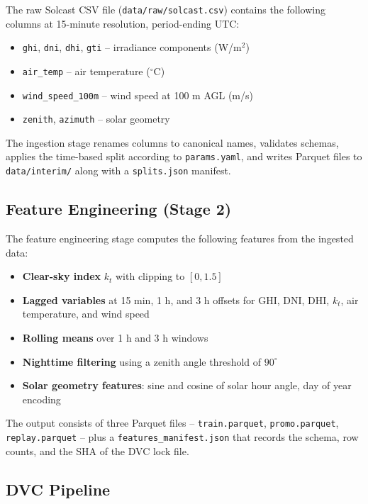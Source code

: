 \documentclass[11pt,a4paper]{article}
\begin{document}
The raw Solcast CSV file (\texttt{data/raw/solcast.csv}) contains the following columns at 15-minute resolution, period-ending UTC:

\begin{itemize}
    \item \texttt{ghi}, \texttt{dni}, \texttt{dhi}, \texttt{gti}  --  irradiance components (W/m$^2$)
    \item \texttt{air\_temp}  --  air temperature ($^\circ$C)
    \item \texttt{wind\_speed\_100m}  --  wind speed at 100 m AGL (m/s)
    \item \texttt{zenith}, \texttt{azimuth}  --  solar geometry
\end{itemize}

The ingestion stage renames columns to canonical names, validates schemas, applies the time-based split according to \texttt{params.yaml}, and writes Parquet files to \texttt{data/interim/} along with a \texttt{splits.json} manifest.

\subsection{Feature Engineering (Stage 2)}

The feature engineering stage computes the following features from the ingested data:

\begin{itemize}
    \item \textbf{Clear-sky index} $k_t$ with clipping to $[0, 1.5]$
    \item \textbf{Lagged variables} at 15 min, 1 h, and 3 h offsets for GHI, DNI, DHI, $k_t$, air temperature, and wind speed
    \item \textbf{Rolling means} over 1 h and 3 h windows
    \item \textbf{Nighttime filtering} using a zenith angle threshold of $90^\circ$
    \item \textbf{Solar geometry features}: sine and cosine of solar hour angle, day of year encoding
\end{itemize}

The output consists of three Parquet files -- \texttt{train.parquet}, \texttt{promo.parquet}, \texttt{replay.parquet} -- plus a \texttt{features\_manifest.json} that records the schema, row counts, and the SHA of the DVC lock file.

\subsection{DVC Pipeline}
\end{document}
